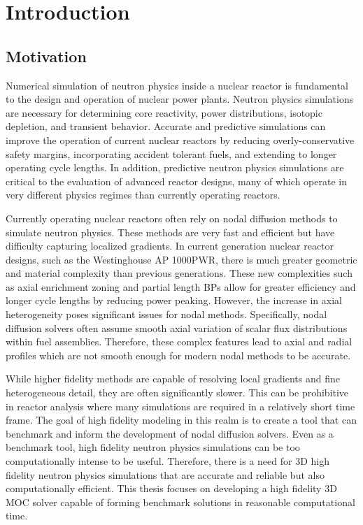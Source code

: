 \chapter{Introduction}
\label{chap:intro}

\section{Motivation}
\label{sec:chap1-motivation}


Numerical simulation of neutron physics inside a nuclear reactor is fundamental to the design and operation of nuclear power plants. Neutron physics simulations are necessary for determining core reactivity, power distributions, isotopic depletion, and transient behavior. Accurate and predictive simulations can improve the operation of current nuclear reactors by reducing overly-conservative safety margins, incorporating accident tolerant fuels, and extending to longer operating cycle lengths. In addition, predictive neutron physics simulations are critical to the evaluation of advanced reactor designs, many of which operate in very different physics regimes than currently operating reactors. 

Currently operating nuclear reactors often rely on nodal diffusion methods to simulate neutron physics. These methods are very fast and efficient but have difficulty capturing localized gradients. In current generation nuclear reactor designs, such as the Westinghouse AP 1000\texttrademark \ac{PWR}, there is much greater geometric and material complexity than previous generations. These new complexities such as axial enrichment zoning and partial length \acp{BP} allow for greater efficiency and longer cycle lengths by reducing power peaking. However, the increase in axial heterogeneity poses significant issues for nodal methods. Specifically, nodal diffusion solvers often assume smooth axial variation of scalar flux distributions within fuel assemblies. Therefore, these complex features  lead to axial and radial profiles which are not smooth enough for modern nodal methods to be accurate.

While higher fidelity methods are capable of resolving local gradients and fine heterogeneous detail, they are often significantly slower. This can be prohibitive in reactor analysis where many simulations are required in a relatively short time frame. The goal of high fidelity modeling in this realm is to create a tool that can benchmark and inform the development of nodal diffusion solvers. Even as a benchmark tool, high fidelity neutron physics simulations can be too computationally intense to be useful. Therefore, there is a need for 3D high fidelity neutron physics simulations that are accurate and reliable but also computationally efficient. This thesis focuses on developing a high fidelity 3D \ac{MOC} solver capable of forming benchmark solutions in reasonable computational time.

